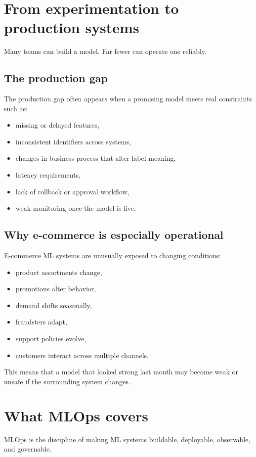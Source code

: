 \section{From experimentation to production systems}
Many teams can build a model.
Far fewer can operate one reliably.

\subsection{The production gap}
The production gap often appears when a promising model meets real constraints such as:
\begin{itemize}
  \item missing or delayed features,
  \item inconsistent identifiers across systems,
  \item changes in business process that alter label meaning,
  \item latency requirements,
  \item lack of rollback or approval workflow,
  \item weak monitoring once the model is live.
\end{itemize}

\subsection{Why e-commerce is especially operational}
E-commerce ML systems are unusually exposed to changing conditions:
\begin{itemize}
  \item product assortments change,
  \item promotions alter behavior,
  \item demand shifts seasonally,
  \item fraudsters adapt,
  \item support policies evolve,
  \item customers interact across multiple channels.
\end{itemize}

This means that a model that looked strong last month may become weak or unsafe if the surrounding system changes.

\section{What MLOps covers}
MLOps is the discipline of making ML systems buildable, deployable, observable, and governable.

